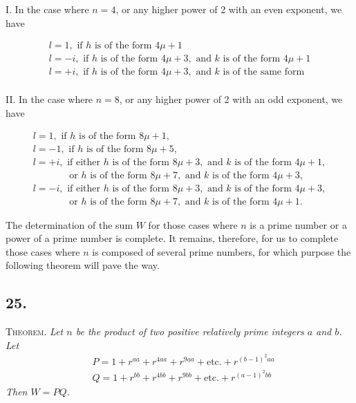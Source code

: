 \documentclass[twoside,12pt, showframe]{memoir}
\begin{document}
I. In the case where \(n = 4\), or any higher power of 2 with an even exponent, we have

\[
\begin{array}{l}
l = 1,\text{ if }h\text{ is of the form }4\mu+1\\ 
l = -i,\text{ if }h\text{ is of the form }4\mu+3,\text{ and }k\text{ is of the form }4\mu+1\\
l = +i,\text{ if }h\text{ is of the form }4\mu+3,\text{ and }k\text{ is of the same form}\\
\end{array}
\]

II. In the case where \(n = 8\), or any higher power of 2 with an odd exponent, we have

\[
\begin{array}{l} 
l = 1, \text{ if }h\text{ is of the form }8\mu+1, \\
l = -1, \text{ if }h\text{ is of the form }8\mu+5, \\
l = +i, \text{ if either }h\text{ is of the form }8\mu+3, \text{ and } k\text{ is of the form }4\mu+1,\\
\phantom{l = +i} \quad \text{or }h\text{ is of the form }8\mu+7, \text{ and } k\text{ is of the form }4\mu+3,\\
l = -i, \text{ if either }h\text{ is of the form }8\mu+3, \text{ and } k\text{ is of the form }4\mu+3, \\
\phantom{l = -i}\quad \text{or }h\text{ is of the form }8\mu+7, \text{ and } k\text{ is of the form }4\mu+1.
\end{array}
\]

The determination of the sum \(W\) for those cases where \(n\) is a prime number or a power of a prime number is complete. It remains, therefore, for us to complete those cases where \(n\) is composed of several prime numbers, for which purpose the following theorem will pave the way.
%

\subsection*{25.}

\textsc{Theorem.} \textit{Let \(n\) be the product of two positive relatively prime integers \(a\) and \(b\). Let}
\[\begin{aligned}
& P=1+r^{a a}+r^{4 a a}+r^{9 a a}+\text{etc.}+r^{(b-1)^{2} a a} \\
& Q=1+r^{b b}+r^{4 b b}+r^{9 b b}+\text{etc.}+r^{(a-1)^{2} b b}
\end{aligned}\]
\textit{Then \(W=PQ\).}
\end{document}
